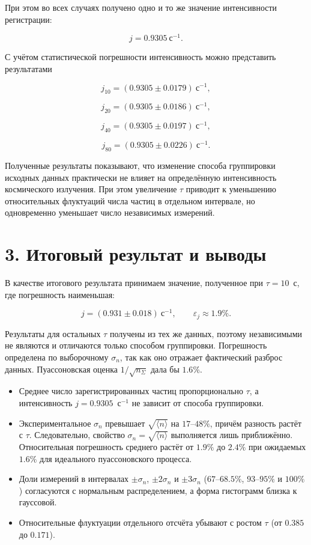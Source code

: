 \documentclass[12pt,a4paper]{article}
\begin{document}
При этом во всех случаях получено одно и то же значение интенсивности регистрации:

\[
j=0.9305~\text{с}^{-1}.
\]

С учётом статистической погрешности интенсивность можно представить результатами

\[
j_{10}=(0.9305\pm0.0179)~\text{с}^{-1},
\]

\[
j_{20}=(0.9305\pm0.0186)~\text{с}^{-1},
\]

\[
j_{40}=(0.9305\pm0.0197)~\text{с}^{-1},
\]

\[
j_{80}=(0.9305\pm0.0226)~\text{с}^{-1}.
\]

Полученные результаты показывают, что изменение способа группировки исходных данных практически не влияет на определённую интенсивность космического излучения. При этом увеличение $\tau$ приводит к уменьшению относительных флуктуаций числа частиц в отдельном интервале, но одновременно уменьшает число независимых измерений.

\section*{3. Итоговый результат и выводы}

В качестве итогового результата принимаем значение, полученное при $\tau=10$~с, где погрешность наименьшая:

\[
j=(0.931\pm0.018)~\text{с}^{-1},
\qquad
\varepsilon_j\approx1.9\%.
\]

Результаты для остальных $\tau$ получены из тех же данных, поэтому независимыми не являются и отличаются только способом группировки. Погрешность определена по выборочному $\sigma_n$, так как оно отражает фактический разброс данных. Пуассоновская оценка $1/\sqrt{n_\Sigma}$ дала бы $1.6\%$.

\begin{itemize}
    \item Среднее число зарегистрированных частиц пропорционально $\tau$, а интенсивность $j=0.9305$~с$^{-1}$ не зависит от способа группировки.
    \item Экспериментальное $\sigma_n$ превышает $\sqrt{\langle n\rangle}$ на $17$--$48\%$, причём разность растёт с $\tau$. Следовательно, свойство $\sigma_n=\sqrt{\langle n\rangle}$ выполняется лишь приближённо. Относительная погрешность среднего растёт от $1.9\%$ до $2.4\%$ при ожидаемых $1.6\%$ для идеального пуассоновского процесса.
    \item Доли измерений в интервалах $\pm\sigma_n$, $\pm2\sigma_n$ и $\pm3\sigma_n$ ($67$--$68.5\%$, $93$--$95\%$ и $100\%$) согласуются с нормальным распределением, а форма гистограмм близка к гауссовой.
    \item Относительные флуктуации отдельного отсчёта убывают с ростом $\tau$ (от $0.385$ до $0.171$).
\end{itemize}
\end{document}
